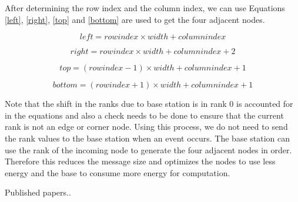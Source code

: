 \documentclass[conference]{IEEEtran}
\begin{document}
	After determining the row index and the column index, we can use Equations \ref{left}, \ref{right}, \ref{top} and \ref{bottom} are used to get the four adjacent nodes. 
	
	\begin{equation}
	left = row index \times width + column index
	\label{left}
	\end{equation}
	
	
	\begin{equation}
	right = row index\times width + column index + 2
	\label{right}
	\end{equation}
	
	\begin{equation}
	top = (row index - 1) \times width + column index + 1
	\label{top}
	\end{equation}
	
	
	\begin{equation}
	bottom = (row index + 1) \times width + column index + 1
	\label{bottom}
	\end{equation}
	
	Note that the shift in the ranks due to base station is in rank 0 is accounted for in the equations and also a check needs to be done to ensure that the current rank is not an edge or corner node. Using this process, we do not need to send the rank values to the base station when an event occurs. The base station can use the rank of the incoming node to generate the four adjacent nodes in order. Therefore this reduces the message size and optimizes the nodes to use less energy and the base to consume more energy for computation.
	

	Published papers..
	
\end{document}
